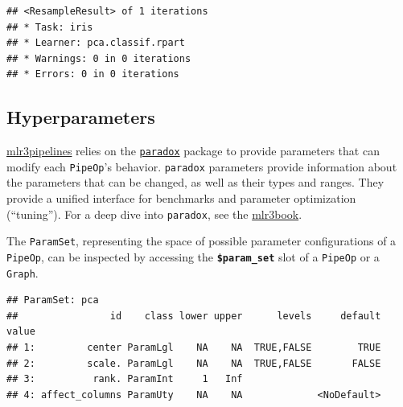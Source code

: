 \documentclass[]{scrbook}
\newenvironment{Shaded}{\begin{snugshade}}{\end{snugshade}}
\newcommand{\KeywordTok}[1]{\textcolor[rgb]{0.13,0.29,0.53}{\textbf{#1}}}
\newcommand{\NormalTok}[1]{#1}
\newcommand{\OperatorTok}[1]{\textcolor[rgb]{0.81,0.36,0.00}{\textbf{#1}}}
\newcommand{\StringTok}[1]{\textcolor[rgb]{0.31,0.60,0.02}{#1}}
\renewenvironment{Shaded} {\begin{snugshade}\small} {\end{snugshade}}
\begin{document}
\begin{Shaded}
\end{Shaded}

\begin{verbatim}
## <ResampleResult> of 1 iterations
## * Task: iris
## * Learner: pca.classif.rpart
## * Warnings: 0 in 0 iterations
## * Errors: 0 in 0 iterations
\end{verbatim}

\hypertarget{hyperparameters}{%
\subsection{Hyperparameters}\label{hyperparameters}}

\href{https://cran.r-project.org/package=mlr3pipelines}{mlr3pipelines} relies on the \href{https://paradox.mlr-org.com}{\texttt{paradox}} package to provide parameters that can modify each \texttt{PipeOp}'s behavior.
\texttt{paradox} parameters provide information about the parameters that can be changed, as well as their types and ranges.
They provide a unified interface for benchmarks and parameter optimization (``tuning'').
For a deep dive into \texttt{paradox}, see the \href{https://mlr3book.mlr-org.com}{mlr3book}.

The \texttt{ParamSet}, representing the space of possible parameter configurations of a \texttt{PipeOp}, can be inspected by accessing the \textbf{\texttt{\$param\_set}} slot of a \texttt{PipeOp} or a \texttt{Graph}.

\begin{Shaded}
\end{Shaded}

\begin{verbatim}
## ParamSet: pca
##                id    class lower upper      levels     default value
## 1:         center ParamLgl    NA    NA  TRUE,FALSE        TRUE      
## 2:         scale. ParamLgl    NA    NA  TRUE,FALSE       FALSE      
## 3:          rank. ParamInt     1   Inf                              
## 4: affect_columns ParamUty    NA    NA             <NoDefault>
\end{verbatim}
\end{document}
